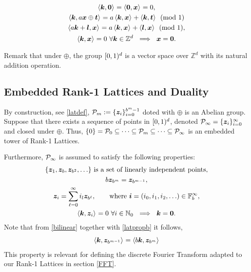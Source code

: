 \documentclass[graybox]{svmult}
\newcommand{\Z}{\mathbb{Z}} %
\newcommand{\N}{\mathbb{N}} %
\newcommand{\F}{\mathbb{F}} %
\newcommand{\bszero}{\boldsymbol{0}} %
\newcommand{\bst}{\boldsymbol{t}}    %
\newcommand{\bsx}{\boldsymbol{x}}    %
\newcommand{\bsz}{\boldsymbol{z}}    %
\begin{document}
\begin{subequations}
\begin{gather}
\ip{\bsk}{\bszero} = \ip{\bszero}{\bsx} = 0,\\
\ip{\bsk}{a \bsx \oplus \bst} = a\ip{\bsk}{\bsx} + \ip{\bsk}{\bst} \pmod 1 \label{bilinearlinxprop} \\
\ip{a \bsk + \bsl}{\bsx} = a\ip{\bsk}{\bsx} + \ip{\bsl}{\bsx} \pmod 1, \label{bilinearlinkprop}\\
\ip{\bsk}{\bsx} = 0 \ \forall \bsk \in \Z^d \ \implies \ \bsx=\bszero.\label{bilinearlinzeroprop}
\end{gather}
\end{subequations}

Remark that under $\oplus$, the group $[0,1)^d$ is a vector space over $\Z^d$ with its natural addition operation.

\subsection{Embedded Rank-1 Lattices and Duality}
By construction, see \eqref{latdef}, $\cp_m := \{\bsz_i\}_{i=0}^{b^m-1}$ doted with $\oplus$ is an Abelian group. Suppose that there exists a sequence of points in $[0,1)^d$, denoted $\cp_\infty =\{\bsz_i\}_{i=0}^{\infty}$ and closed under $\oplus$. Thus, $\{0\}=\mathcal{P}_0\subseteq\dots\subseteq\mathcal{P}_m\subseteq\dots\subseteq\mathcal{P}_\infty$ is an embedded tower of Rank-1 Lattices.

Furthermore, $\mathcal{P}_\infty$ is assumed to satisfy the following properties:
\begin{subequations} \label{cpinfvector}
\begin{gather}
\{\bsz_{1}, \bsz_{b}, \bsz_{b^2}, \ldots\} \text{ is a set of linearly independent points}, \\
b\bsz_{b^m}=\bsz_{b^{m-1}},\label{latpropb}\\
\bsz_i = \sum_{\ell=0}^{\infty} i_l \bsz_{b^\ell}, \qquad \text{where }\bsi=(i_0, i_1, i_2, \ldots ) \in \F_b^\infty, \label{latpropc}\\
\ip{\bsk}{\bsz_i} =  0 \ \forall i \in \N_0   \ \implies \ \bsk=\bszero. \label{latpropd}
\end{gather}
\end{subequations}
Note that from \eqref{bilinear} together with \eqref{latpropb} it follows,
\begin{equation}\label{assumgenip}
\ip{\bsk}{\bsz_{b^{m-1}}}=\ip{b\bsk}{\bsz_{b^m}}
\end{equation}
This property is relevant for defining the discrete Fourier Transform adapted to our Rank-1 Lattices in section \ref{FFT}.
\end{document}
